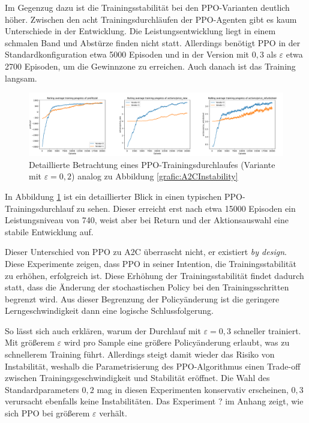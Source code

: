 Im Gegenzug dazu ist die Trainingsstabilität bei den PPO-Varianten deutlich höher.
Zwischen den acht Trainingsdurchläufen der PPO-Agenten gibt es kaum Unterschiede in der Entwicklung.
Die Leistungsentwicklung liegt in einem schmalen Band und Abstürze finden nicht statt.
Allerdings benötigt PPO in der Standardkonfiguration etwa 5000 Episoden und in der Version mit $0,3$ als $\varepsilon$ etwa 2700 Episoden, um die Gewinnzone zu erreichen.
Auch danach ist das Training langsam.
\begin{figure}[htbp]
	\centering
	\includegraphics[width=\textwidth]{main/ppo_detailed_analysis.pdf}
	\caption{Detaillierte Betrachtung eines PPO-Trainingsdurchlaufes (Variante mit $\varepsilon=0,2$) analog zu Abbildung \ref{grafic:A2CInstability}}
	\label{grafic:PPOStability}
\end{figure}
In Abbildung \ref{grafic:PPOStability} ist ein detaillierter Blick in einen typischen PPO-Trainingsdurchlauf zu sehen.
Dieser erreicht erst nach etwa 15000 Episoden ein Leistungsniveau von 740, weist aber bei Return und der Aktionsauswahl eine stabile Entwicklung auf.

Dieser Unterschied von PPO zu A2C überrascht nicht, er existiert \textit{by design}.
Diese Experimente zeigen, dass PPO in seiner Intention, die Trainingsstabilität zu erhöhen, erfolgreich ist.
Diese Erhöhung der Trainingsstabilität findet dadurch statt, dass die Änderung der stochastischen Policy bei den Trainingsschritten begrenzt wird.
Aus dieser Begrenzung der Policyänderung ist die geringere Lerngeschwindigkeit dann eine logische Schlussfolgerung.

So lässt sich auch erklären, warum der Durchlauf mit $\varepsilon=0,3$ schneller trainiert.
Mit größerem $\varepsilon$ wird pro Sample eine größere Policyänderung erlaubt, was zu schnellerem Training führt.
Allerdings steigt damit wieder das Risiko von Instabilität, weshalb die Parametrisierung des PPO-Algorithmus einen Trade-off zwischen Trainingsgeschwindigkeit und Stabilität eröffnet.
Die Wahl des Standardparameters $0,2$ mag in diesen Experimenten konservativ erscheinen, $0,3$ verursacht ebenfalls keine Instabilitäten.
Das Experiment ? im Anhang zeigt, wie sich PPO bei größerem $\varepsilon$ verhält.

